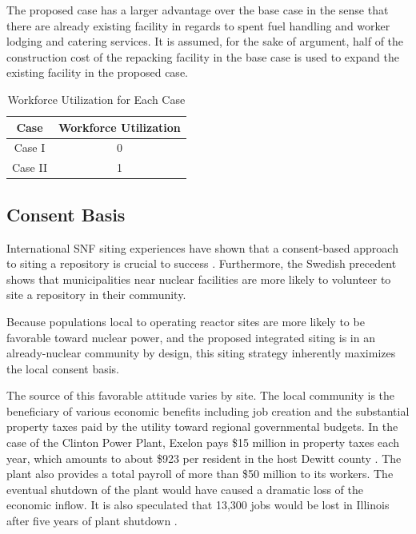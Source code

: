 The proposed case has a larger advantage over the base case in the sense that there
are already existing facility in regards to spent fuel handling and worker lodging 
and catering services. 
It is assumed, for the sake of argument, half of the construction cost of the
repacking facility in the base case is used to expand the existing facility in the
proposed case. 


\begin{table}[h]
	\centering
        \caption {Workforce Utilization for Each Case}
		\begin{tabular}{|c|c|}
			\hline
			Case & Workforce Utilization \\
			\hline
			Case I & 0 \\
			Case II & 1 \\
			\hline
                \end{tabular}
\end{table}


\subsection{Consent Basis}

International \gls{SNF} siting experiences have shown that a consent-based
approach to siting a repository is crucial to success
\cite{ayers_blue_2012,doe_designing_2016,jenkins-smith_public_2013,freeze_siting_2015}. 
Furthermore, the Swedish precedent \cite{olsson_experiences_2013} shows that 
municipalities near nuclear facilities
are more likely to volunteer to site a repository in their community.

Because populations local to operating reactor sites are more likely to be 
favorable toward nuclear power, and the proposed integrated siting 
is in an already-nuclear community by design, this siting strategy inherently 
maximizes the local consent basis.

The source of this favorable attitude varies by site. 
The local community is the beneficiary of various economic benefits
including job creation and the substantial property taxes paid by the utility 
toward regional governmental budgets.   In the case of the Clinton Power Plant, 
Exelon pays \$15 million in property taxes each year, which amounts to about 
\$923 per resident in the host Dewitt county \cite{brady-lunny_dewitt_2016}. The plant
also provides a total payroll of more than \$50 million to its workers.
The eventual shutdown of the plant would have caused a dramatic loss of the economic inflow.
It is also speculated that 13,300 jobs would be lost in Illinois after five years 
of plant shutdown \cite{reid_study:_2014}.  

